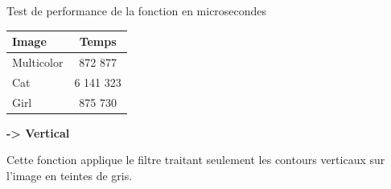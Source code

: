 \documentclass{article}
\begin{document}
\begin{center}
\medbreak
Test de performance de la fonction en microsecondes
\bigbreak
   \begin{tabular}{ | l | c | }
     \hline
     Image & Temps \\
     \hline
     Multicolor & 872 877 \\
     \hline
     Cat & 6 141 323 \\
     \hline
     Girl & 875 730 \\
     \hline
   \end{tabular}
 \end{center}
\bigbreak

\textbf{-> Vertical}

Cette fonction applique le filtre traitant seulement les contours verticaux sur l'image en teintes de gris.
\end{document}
